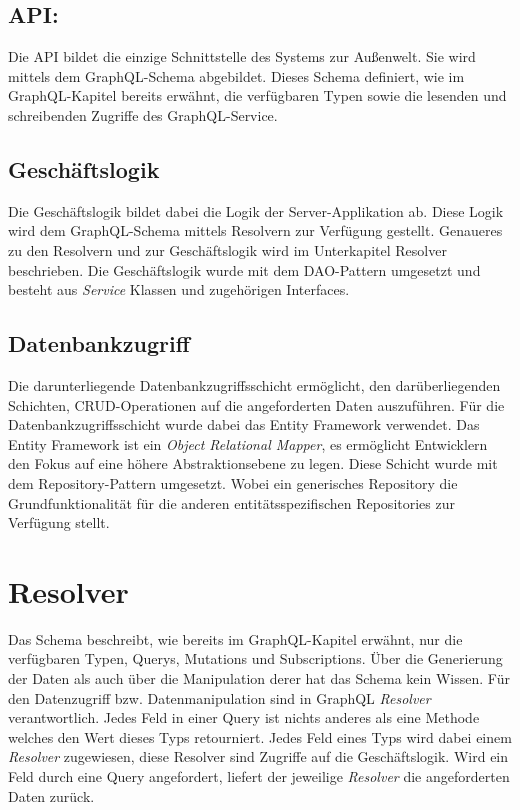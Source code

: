 \subsection{API:}
Die API bildet die einzige Schnittstelle des Systems zur Außenwelt.
Sie wird mittels dem GraphQL-Schema abgebildet.
Dieses Schema definiert, wie im GraphQL-Kapitel bereits erwähnt, die verfügbaren Typen sowie die lesenden und schreibenden Zugriffe des GraphQL-Service.

\subsection{Geschäftslogik}
Die Geschäftslogik bildet dabei die Logik der Server-Applikation ab.
Diese Logik wird dem GraphQL-Schema mittels Resolvern zur Verfügung gestellt.
Genaueres zu den Resolvern und zur Geschäftslogik wird im Unterkapitel Resolver beschrieben.
Die Geschäftslogik wurde mit dem DAO-Pattern umgesetzt und besteht aus \textit{Service} Klassen und zugehörigen Interfaces.

\subsection{Datenbankzugriff}
Die darunterliegende Datenbankzugriffsschicht ermöglicht, den darüberliegenden Schichten, CRUD-Operationen auf die angeforderten Daten auszuführen.
Für die Datenbankzugriffsschicht wurde dabei das Entity Framework verwendet.
Das Entity Framework ist ein \textit{Object Relational Mapper}, es ermöglicht Entwicklern den Fokus auf eine höhere Abstraktionsebene zu legen.
Diese Schicht wurde mit dem Repository-Pattern umgesetzt.
Wobei ein generisches Repository die Grundfunktionalität für die anderen entitätsspezifischen Repositories zur Verfügung stellt.

\section{Resolver}
Das Schema beschreibt, wie bereits im GraphQL-Kapitel erwähnt, nur die verfügbaren Typen, Querys, Mutations und Subscriptions.
Über die Generierung der Daten als auch über die Manipulation derer hat das Schema kein Wissen.
Für den Datenzugriff bzw. Datenmanipulation sind in GraphQL \textit{Resolver} verantwortlich.
Jedes Feld in einer Query ist nichts anderes als eine Methode welches den Wert dieses Typs retourniert.
Jedes Feld eines Typs wird dabei einem \textit{Resolver} zugewiesen, diese Resolver sind Zugriffe auf die Geschäftslogik.
Wird ein Feld durch eine Query angefordert, liefert der jeweilige \textit{Resolver} die angeforderten Daten zurück.

